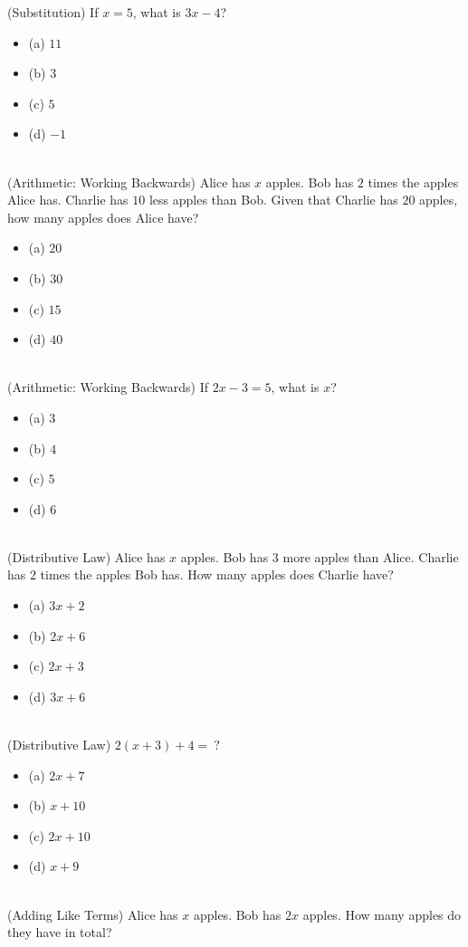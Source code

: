 \documentclass{article}
\begin{document}
(Substitution) If $x=5$, what is $3x-4$?
\begin{itemize}
    \item[] (a) $11$
    \item[] (b) $3$
    \item[] (c) $5$
    \item[] (d) $-1$
\end{itemize} \hrulefill \\[10pt]
(Arithmetic: Working Backwards) Alice has $x$ apples. Bob has $2$ times the apples Alice has. Charlie has $10$ less apples than Bob. Given that Charlie has $20$ apples, how many apples does Alice have? 
\begin{itemize}
    \item[](a) $20$
    \item[](b) $30$
    \item[](c) $15$
    \item[](d) $40$
\end{itemize} \hrulefill \\[10pt]
\newpage
\noindent (Arithmetic: Working Backwards) If $2x-3 = 5$, what is $x$?
\begin{itemize}
    \item[] (a) $3$
    \item[] (b) $4$
    \item[] (c) $5$
    \item[] (d) $6$
\end{itemize} \hrulefill \\[10pt]
(Distributive Law) Alice has $x$ apples. Bob has 3 more apples than Alice. Charlie has 2 times the apples Bob has. How many apples does Charlie have? 
\begin{itemize}
    \item[] (a) $3x+2$
    \item[] (b) $2x+6$
    \item[] (c) $2x+3$
    \item[] (d) $3x+6$
\end{itemize} \hrulefill \\[10pt]
(Distributive Law) $2(x+3)+4 =\ ?$
\begin{itemize}
    \item[] (a) $2x+7$
    \item[] (b) $x+10$
    \item[] (c) $2x+10$
    \item[] (d) $x+9$
\end{itemize} \hrulefill \\[10pt]
(Adding Like Terms) Alice has $x$ apples. Bob has $2x$ apples. How many apples do they have in total? 
\end{document}
